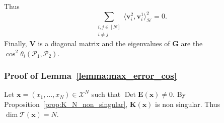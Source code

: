 \documentclass[twoside,11pt]{book}
\numberwithin{theorem}{chapter}
\numberwithin{definition}{chapter}
\numberwithin{proposition}{chapter}
\numberwithin{corollary}{chapter}
\numberwithin{example}{chapter}
\numberwithin{lemma}{chapter}
\numberwithin{assumption}{chapter}
\numberwithin{equation}{chapter}
\numberwithin{figure}{chapter}
\DeclareMathOperator{\Det}{Det}
\begin{document}
Thus
\begin{equation}
\sum\limits_{\substack{i,j \in [N]\\ i \neq j}} \langle \bm{v}_{i}^{2}, \bm{v}_{i}^{1}\rangle_{\mathcal{H}}^{2} = 0 .
\end{equation}
Finally, $\bm{V}$ is a diagonal matrix and the eigenvalues of $\bm{G}$ are the $\cos^{2} \theta_{i}(\mathcal{P}_{1},\mathcal{P}_{2})$.
\subsubsection{Proof of Lemma~\ref{lemma:max_error_cos}}

Let $\bm{x} = (x_{1}, \dots, x_N) \in \mathcal{X}^{N}$ such that $\Det \bm{E}(\bm{x}) \neq 0$. By Proposition~\ref{prop:K_N_non_singular}, $\bm{K}(\bm{x})$ is non singular. Thus $\dim \mathcal{T}(\bm{x}) = N$. 
\end{document}
